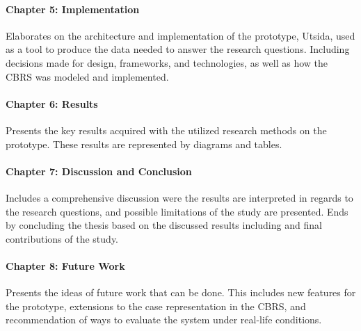 \paragraph{Chapter 5: Implementation}
Elaborates on the architecture and implementation of the prototype, Utsida, used as a tool to produce the data needed to answer the research questions. Including decisions made for design, frameworks, and technologies, as well as how the CBRS was modeled and implemented.

\paragraph{Chapter 6: Results}
Presents the key results acquired with the utilized research methods on the prototype. These results are represented by diagrams and tables.

\paragraph{Chapter 7: Discussion and Conclusion}
Includes a comprehensive discussion were the results are interpreted in regards to the research questions, and possible limitations of the study are presented. Ends by concluding the thesis based on the discussed results including and final contributions of the study.

\paragraph{Chapter 8: Future Work}
Presents the ideas of future work that can be done. This includes new features for the prototype, extensions to the case representation in the CBRS, and recommendation of ways to evaluate the system under real-life conditions. 


\cleardoublepage